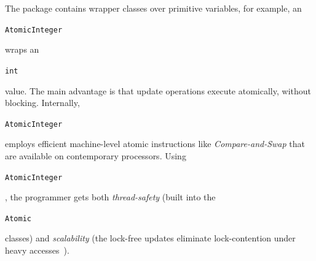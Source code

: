 \documentclass[10pt,twocolumn]{article}
\newcommand{\code}[1]{\begin{smaller}\texttt{#1}\end{smaller}}
\begin{document}
The package contains wrapper classes over primitive variables, for example,
an \code{AtomicInteger} wraps an \code{int} value. The main advantage
is that update operations execute atomically, without blocking. 
Internally, \code{AtomicInteger} employs efficient machine-level
atomic instructions like \emph{Compare-and-Swap} that are available on 
contemporary processors. Using \code{AtomicInteger}, the programmer
gets both \emph{thread-safety} (built into the \code{Atomic} classes) and
\emph{scalability} (the lock-free updates eliminate lock-contention under heavy
accesses~\cite{Goetz:JCP06}).

% 

 
\end{document}
